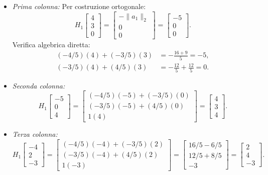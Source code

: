 \begin{example}
\begin{enumerate}
\begin{itemize}
        \item \textit{Prima colonna:} Per costruzione ortogonale:
        \begin{equation}
            H_1 \begin{bmatrix} 4 \\ 3 \\ 0 \end{bmatrix} = \begin{bmatrix} -\|a_1\|_2 \\ 0 \\ 0 \end{bmatrix} = \begin{bmatrix} -5 \\ 0 \\ 0 \end{bmatrix}.
        \end{equation}
        Verifica algebrica diretta:
        \begin{align*}
            (-4/5)(4) + (-3/5)(3) &= -\frac{16+9}{5} = -5, \\
            (-3/5)(4) + (4/5)(3) &= -\frac{12}{5} + \frac{12}{5} = 0.
        \end{align*}
        \item \textit{Seconda colonna:}
        \begin{equation}
            H_1 \begin{bmatrix} -5 \\ 0 \\ 4 \end{bmatrix} = \begin{bmatrix} (-4/5)(-5) + (-3/5)(0) \\ (-3/5)(-5) + (4/5)(0) \\ 1(4) \end{bmatrix} = \begin{bmatrix} 4 \\ 3 \\ 4 \end{bmatrix}.
        \end{equation}
        \item \textit{Terza colonna:}
        \begin{equation}
            H_1 \begin{bmatrix} -4 \\ 2 \\ -3 \end{bmatrix} = \begin{bmatrix} (-4/5)(-4) + (-3/5)(2) \\ (-3/5)(-4) + (4/5)(2) \\ 1(-3) \end{bmatrix} = \begin{bmatrix} 16/5 - 6/5 \\ 12/5 + 8/5 \\ -3 \end{bmatrix} = \begin{bmatrix} 2 \\ 4 \\ -3 \end{bmatrix}.

\end{equation}
\end{itemize}
\end{enumerate}
\end{example}
